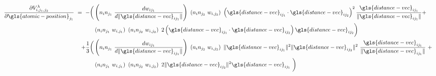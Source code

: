 \documentclass{article}
\begin{document}
\begin{equation}
\begin{split}
\frac{\partial V^{\lambda}_{i,j_1,j_2}}{\partial \gls{atomic-position}_{j_1}}\ =\ - \bigg(&\left(n_i n_{j_1}\ \frac{d w_{ij_1}}{ d \| \gls{distance-vec}_{ij_1} \|} \right) \left(n_i n_{j_2}\ w_{i,j_2}\right)\ \left(\gls{distance-vec}_{ij_1} \cdot \gls{distance-vec}_{ij_2} \right)^2 \frac{\gls{distance-vec}_{ij_1}}{\| \gls{distance-vec}_{ij_1} \|} +\ \\ 
&\left(n_i n_{j_1}\ w_{i,j_1}\right) \left(n_i n_{j_2}\ w_{i,j_2}\right)\ 2 \left(\gls{distance-vec}_{ij_1} \cdot \gls{distance-vec}_{ij_2} \right) \gls{distance-vec}_{ij_2}\bigg) \\
+ \frac{1}{3}\bigg(&\left(n_i n_{j_1}\ \frac{d w_{ij_1}}{ d \| \gls{distance-vec}_{ij_1} \|} \right)\ \left(n_i n_{j_2}\ w_{i,j_2}\right)\ \| \gls{distance-vec}_{ij_1} \|^2 \| \gls{distance-vec}_{ij_2} \|^2\ \frac{\gls{distance-vec}_{ij_1}}{\| \gls{distance-vec}_{ij_1} \|} +\ \\
&\left(n_i n_{j_1}\ w_{i,j_1}\right)\ \left(n_i n_{j_2}\ w_{i,j_2}\right)\ 2 \| \gls{distance-vec}_{ij_2} \|^2 \gls{distance-vec}_{ij_1} \bigg)    
\end{split}
\end{equation}
\end{document}
